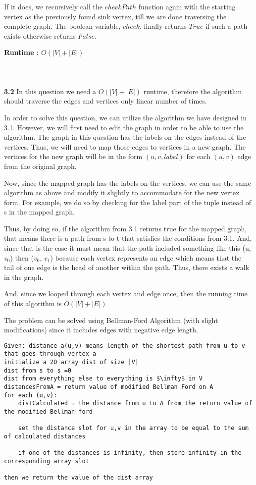 \documentclass[letterpaper,11pt]{article}
\newcounter{problemid}\stepcounter{problemid}
\def\newproblem{\vspace*{0.5cm}{\bf Problem~\arabic{problemid}\stepcounter{problemid}}\hfill\fbox{\parbox{0.16\textwidth}{\bf Points:}}\par}
\begin{document}
    If it does, we recursively call the $checkPath$ function again with the starting vertex as the previously found sink vertex, till we are done traversing the complete graph. The boolean variable, $check$, finally returns $True$ if such a path exists otherwise returns $False$. 
    
{\bf Runtime :}
     $O(|V|+|E|)$
 \\\\\\\\ 
{\bf 3.2}  In this question we need a $O(|V|+|E|)$ runtime, therefore the algorithm should traverse the edges and vertices only linear number of times.

In order to solve this question, we can utilize the algorithm we have designed in 3.1. However, we will first need to edit the graph in order to be able to use the algorithm. The graph in this question has the labels on the edges instead of the vertices. Thus, we will need to map those edges to vertices in a new graph. The vertices for the new graph will be in the form $(u,v, label)$ for each $(u,v)$ edge from the original graph. 

Now, since the mapped graph has the labels on the vertices, we can use the same algorithm as above and modify it slightly to accommodate for the new vertex form. For example, we do so by checking for the label part of the tuple instead of s in the mapped graph.

Thus, by doing so, if the algorithm from 3.1 returns true for the mapped graph, that means there is a path from s to t that satisfies the conditions from 3.1. And, since that is the case it must mean that the path included something like this (u, $v_0$) then ($v_0$, $v_1$) because each vertex represents an edge which means that the tail of one edge is the head of another within the path. Thus, there exists a walk in the graph. 

And, since we looped through each vertex and edge once, then the running time of this algorithm is $O(|V|+|E|)$


\newproblem
The problem can be solved using Bellman-Ford Algorithm (with slight modifications) since it includes edges with negative edge length. 


\begin{Verbatim}[commandchars=\\\{\},codes={\catcode`$=3\catcode`_=8}]
Given: distance a(u,v) means length of the shortest path from u to v that goes through vertex a
initialize a 2D array dist of size |V|
dist from s to s =0
dist from everything else to everything is $\infty$ in V
distancesFromA = return value of modified Bellman Ford on A
for each (u,v):
    distCalculated = the distance from u to A from the return value of the modified Bellman ford
    
    set the distance slot for u,v in the array to be equal to the sum of calculated distances
    
    if one of the distances is infinity, then store infinity in the corresponding array slot

then we return the value of the dist array
\end{Verbatim}
\end{document}
